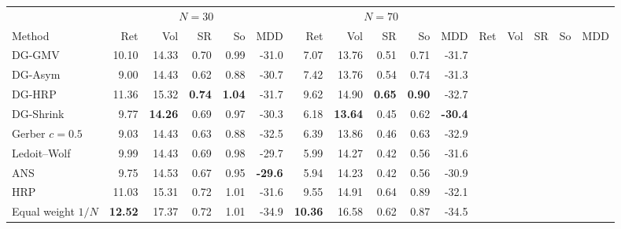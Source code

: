 \begin{tabular}{@{}lrrrrr@{\quad}rrrrr@{\quad}rrrrr@{}}
\toprule
 & \multicolumn{5}{c}{$N=30$} & \multicolumn{5}{c}{$N=70$}\\
\cmidrule(lr){2-6}\cmidrule(lr){7-11}\cmidrule(l){12-16}
Method & Ret & Vol & SR & So & MDD & Ret & Vol & SR & So & MDD & Ret & Vol & SR & So & MDD\\
\midrule
DG-GMV & 10.10 & 14.33 & 0.70 & 0.99 & -31.0 & 7.07 & 13.76 & 0.51 & 0.71 & -31.7\\
DG-Asym & 9.00 & 14.43 & 0.62 & 0.88 & -30.7 & 7.42 & 13.76 & 0.54 & 0.74 & -31.3\\
DG-HRP & 11.36 & 15.32 & \textbf{0.74} & \textbf{1.04} & -31.7 & 9.62 & 14.90 & \textbf{0.65} & \textbf{0.90} & -32.7\\
DG-Shrink & 9.77 & \textbf{14.26} & 0.69 & 0.97 & -30.3 & 6.18 & \textbf{13.64} & 0.45 & 0.62 & \textbf{-30.4}\\
\addlinespace[2pt]
Gerber $c{=}0.5$ & 9.03 & 14.43 & 0.63 & 0.88 & -32.5 & 6.39 & 13.86 & 0.46 & 0.63 & -32.9\\
Ledoit--Wolf & 9.99 & 14.43 & 0.69 & 0.98 & -29.7 & 5.99 & 14.27 & 0.42 & 0.56 & -31.6\\
ANS & 9.75 & 14.53 & 0.67 & 0.95 & \textbf{-29.6} & 5.94 & 14.23 & 0.42 & 0.56 & -30.9\\
HRP & 11.03 & 15.31 & 0.72 & 1.01 & -31.6 & 9.55 & 14.91 & 0.64 & 0.89 & -32.1\\
Equal weight $1/N$ & \textbf{12.52} & 17.37 & 0.72 & 1.01 & -34.9 & \textbf{10.36} & 16.58 & 0.62 & 0.87 & -34.5\\
\bottomrule
\end{tabular}
